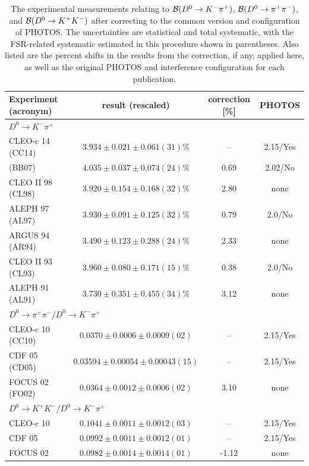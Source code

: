 \begin{table}[!htb]
  \centering 
  \caption{The experimental measurements relating to ${\cal B}(D^0\to K^-\pi^+)$, ${\cal B}(D^0\to \pi^+\pi^-)$, and ${\cal B}(D^0\to K^+ K^-)$ after correcting to the common version and configuration of PHOTOS.  The uncertainties are statistical and total systematic, with the FSR-related systematic estimated in this procedure shown in parentheses.  Also listed are the percent shifts in the results from the correction, if any, applied here, as well as the original PHOTOS and interference configuration for each publication.}
  \label{tab:FSR_corrections}
\begin{tabular}{lccc}
\hline \hline
Experiment (acronym) & result (rescaled) & correction [\%] & PHOTOS \\ \hline
\multicolumn{4}{l}{$D^{0} \to K^{-} \pi^{+}$} \\
      CLEO-c 14  (CC14) \cite{Bonvicini:2013vxi} & $3.934 \pm 0.021 \pm 0.061(31)\%$ & --   & 2.15/Yes \\
      \babar 07  (BB07) \cite{Aubert:2007wn}   & $4.035 \pm 0.037 \pm 0.074(24)\%$ & 0.69 & 2.02/No \\
      CLEO II 98 (CL98) \cite{Artuso:1997mc}   & $3.920 \pm 0.154 \pm 0.168(32)\%$ & 2.80 & none \\
      ALEPH 97   (AL97) \cite{Barate:1997mm}   & $3.930 \pm 0.091 \pm 0.125(32)\%$ & 0.79 & 2.0/No \\
      ARGUS 94   (AR94) \cite{Albrecht:1994nb} & $3.490 \pm 0.123 \pm 0.288(24)\%$ & 2.33 & none \\
      CLEO II 93 (CL93) \cite{Akerib:1993pm}   & $3.960 \pm 0.080 \pm 0.171(15)\%$ & 0.38 & 2.0/No \\
      ALEPH 91   (AL91) \cite{Decamp:1991jw}   & $3.730 \pm 0.351 \pm 0.455(34)\%$ & 3.12 & none \\
\multicolumn{4}{l}{$D^{0} \to \pi^{+}\pi^{-} / D^{0} \to K^{-} \pi^{+}$} \\
      CLEO-c 10  (CC10) \cite{Mendez:2009aa}   & $0.0370  \pm 0.0006  \pm 0.0009(02)$  & --   & 2.15/Yes \\
      CDF 05     (CD05) \cite{Acosta:2004ts}   & $0.03594 \pm 0.00054 \pm 0.00043(15)$ & --   & 2.15/Yes \\
      FOCUS 02   (FO02) \cite{Link:2002hi}     & $0.0364  \pm 0.0012  \pm 0.0006(02)$  & 3.10 & none \\
\multicolumn{4}{l}{$D^{0} \to K^{+}K^{-} / D^{0} \to K^{-} \pi^{+}$} \\
      CLEO-c 10   \cite{Mendez:2009aa}         & $0.1041 \pm 0.0011 \pm 0.0012(03)$ & --    & 2.15/Yes \\ 
      CDF 05      \cite{Acosta:2004ts}         & $0.0992 \pm 0.0011 \pm 0.0012(01)$ & --    & 2.15/Yes \\
      FOCUS 02    \cite{Link:2002hi}           & $0.0982 \pm 0.0014 \pm 0.0014(01)$ & -1.12 & none \\ \hline
\end{tabular}
\end{table}

